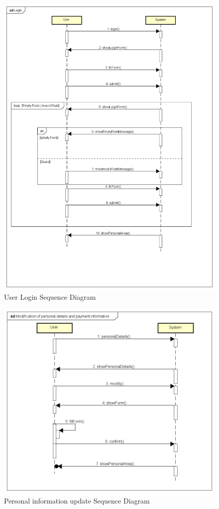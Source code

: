 \begin{figure}[H]	
	\centering
	\includegraphics[width = \textwidth]{img/sequence2}
	\caption{User Login Sequence Diagram}
\end{figure}

\begin{figure}[H]	
	\centering
	\includegraphics[width = \textwidth]{img/sequence3}
	\caption{Personal information update Sequence Diagram}
\end{figure}

